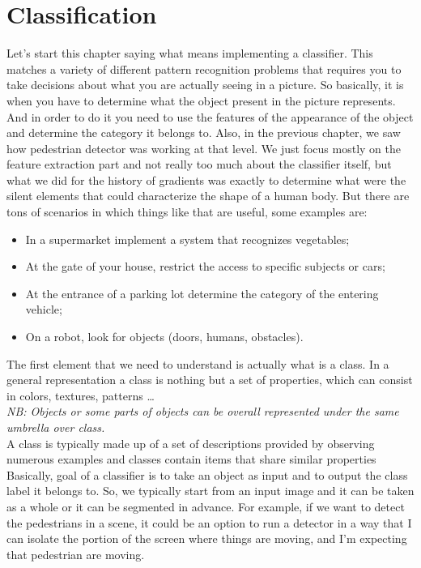 \chapter{Classification}
Let's start this chapter saying what means implementing a classifier.
This matches a variety of different pattern recognition problems that requires you to take decisions about what you are actually seeing in a picture.
So basically, it is when you have to determine what the object present in the picture represents.
And in order to do it you need to use the features of the appearance of the object and determine the category it belongs to.
Also, in the previous chapter, we saw how pedestrian detector was working at that level. 
We just focus mostly on the feature extraction part and not really too much about the classifier itself, 
but what we did for the history of gradients was exactly to determine what were the silent elements 
that could characterize the shape of a human body. 
But there are tons of scenarios in which things like that are useful, some examples are:
\begin{itemize}
    \item In a supermarket implement a system that recognizes vegetables;
    \item At the gate of your house, restrict the access to specific subjects or cars;
    \item At the entrance of a parking lot determine the category of the entering vehicle;
    \item On a robot, look for objects (doors, humans, obstacles).
\end{itemize}
The first element that we need to understand is actually what is a class.
In a general representation a class is nothing but a set of properties, which can consist in colors, textures, patterns \dots
\\\textit{NB: Objects or some parts of objects can be overall represented under the same umbrella over class.}
\\
A class is typically made up of a set of descriptions provided by observing numerous examples and classes contain items that share similar properties
Basically, goal of a classifier is to take an object as input and to output the class label it belongs to.
So, we typically start from an input image and it can be taken as a whole or it can be segmented in advance. 
For example, if we want to detect the pedestrians in a scene, it could be an option to run a detector in a way that I can isolate the portion of the screen where things are moving, and I'm expecting that pedestrian are moving.
